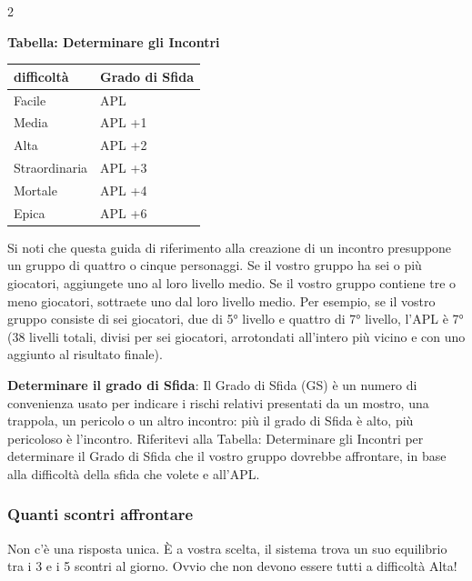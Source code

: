 \begin{multicols}{2}
\medskip

\textbf{Tabella: Determinare gli Incontri}

\medskip

\noindent\begin{tabularx}{\linewidth}{Xl}
	\toprule
\rowcolor{gray!20}\textbf{difficoltà} & \textbf{Grado di Sfida}\\
\toprule
Facile& APL\\
\rowcolor{gray!20}Media& APL +1\\
Alta& APL +2\\
\rowcolor{gray!20}Straordinaria& APL +3\\
Mortale& APL +4\\
\rowcolor{gray!20}Epica& APL +6
\end{tabularx}

\medskip

Si noti che questa guida di riferimento alla creazione di un incontro presuppone un gruppo di quattro o cinque personaggi. Se il vostro gruppo ha sei o più giocatori, aggiungete uno al loro livello medio. Se il vostro gruppo contiene tre o meno giocatori, sottraete uno dal loro livello medio. Per esempio, se il vostro gruppo consiste di sei giocatori, due di 5° livello e quattro di 7° livello, l'APL è 7° (38 livelli totali, divisi per sei giocatori, arrotondati all'intero più vicino e con uno aggiunto al risultato finale).


%

\textbf{Determinare il grado di Sfida}: Il Grado di Sfida (GS) è un numero di convenienza usato per indicare i rischi relativi presentati da un mostro, una trappola, un pericolo o un altro incontro: più il grado di Sfida è alto, più pericoloso è l'incontro. Riferitevi alla Tabella: Determinare gli Incontri per determinare il Grado di Sfida che il vostro gruppo dovrebbe affrontare, in base alla difficoltà della sfida che volete e all'APL.

\subsubsection{Quanti scontri affrontare}\label{quantiincontri}

Non c'è una risposta unica. È a vostra scelta, il sistema trova un suo equilibrio tra i 3 e i 5 scontri al giorno. Ovvio che non devono essere tutti a difficoltà Alta!


\end{multicols}
